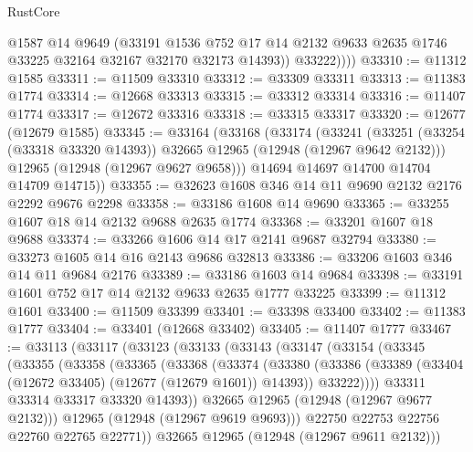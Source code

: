 \begin{lexlean}{RustCore}
\begin{coremodule}
              @1587
              @14
              @9649
              (@33191
                @1536
                @752
                @17
                @14
                @2132
                @9633
                @2635
                @1746
                @33225
                @32164
                @32167
                @32170
                @32173
                @14393))
            @33222))))
@33310 := @11312 @1585
@33311 := @11509 @33310
@33312 := @33309 @33311
@33313 := @11383 @1774
@33314 := @12668 @33313
@33315 := @33312 @33314
@33316 := @11407 @1774
@33317 := @12672 @33316
@33318 := @33315 @33317
@33320 := @12677 (@12679 @1585)
@33345 := @33164
    (@33168
      (@33174
        (@33241
          (@33251 (@33254 (@33318 @33320 @14393)) @32665 @12965 (@12948 (@12967 @9642 @2132)))
          @12965
          (@12948 (@12967 @9627 @9658)))
        @14694
        @14697
        @14700
        @14704
        @14709
        @14715))
@33355 := @32623 @1608 @346 @14 @11 @9690 @2132 @2176 @2292 @9676 @2298
@33358 := @33186 @1608 @14 @9690
@33365 := @33255 @1607 @18 @14 @2132 @9688 @2635 @1774
@33368 := @33201 @1607 @18 @9688
@33374 := @33266 @1606 @14 @17 @2141 @9687 @32794
@33380 := @33273 @1605 @14 @16 @2143 @9686 @32813
@33386 := @33206 @1603 @346 @14 @11 @9684 @2176
@33389 := @33186 @1603 @14 @9684
@33398 := @33191 @1601 @752 @17 @14 @2132 @9633 @2635 @1777 @33225
@33399 := @11312 @1601
@33400 := @11509 @33399
@33401 := @33398 @33400
@33402 := @11383 @1777
@33404 := @33401 (@12668 @33402)
@33405 := @11407 @1777
@33467 := @33113
    (@33117
      (@33123
        (@33133
          (@33143
            (@33147
              (@33154
                (@33345
                  (@33355
                    (@33358
                      (@33365
                        (@33368
                          (@33374
                            (@33380
                              (@33386
                                (@33389 (@33404 (@12672 @33405) (@12677 (@12679 @1601)) @14393))
                                @33222))))
                        @33311
                        @33314
                        @33317
                        @33320
                        @14393))
                    @32665
                    @12965
                    (@12948 (@12967 @9677 @2132)))
                  @12965
                  (@12948 (@12967 @9619 @9693)))
                @22750
                @22753
                @22756
                @22760
                @22765
                @22771))
            @32665
            @12965
            (@12948 (@12967 @9611 @2132)))

\end{coremodule}
\end{lexlean}
